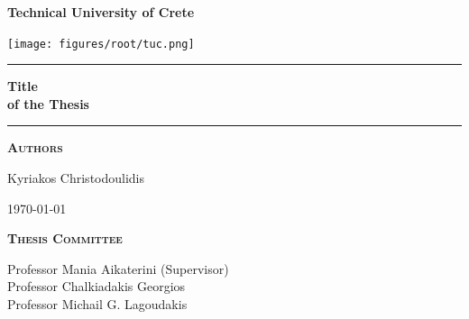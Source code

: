 
\begin{titlepage}
\begin{center}
\vspace{2cm}


\vspace{2.5cm}
{ \huge \bfseries Technical University of Crete} %
\vspace{2.5cm}

\texttt{[image: figures/root/tuc.png]}~\\[1cm]
\vspace{2cm}

\vspace{2cm}

\hrule
\vspace{.5cm}
{ \huge \bfseries Title\\ of the Thesis} %
\vspace{.5cm}

\hrule
\vspace{1.5cm}

\textsc{\textbf{Authors}}\\
\vspace{.5cm}
\centering

Kyriakos Christodoulidis\\

\vspace{4cm}

\centering \today 

\vspace{4cm}

\textsc{\textbf{Thesis Committee}}\\

\vspace{1cm}

Professor Mania Aikaterini (Supervisor)\\
Professor Chalkiadakis Georgios\\
Professor Michail G. Lagoudakis\\
\end{center}
\end{titlepage}